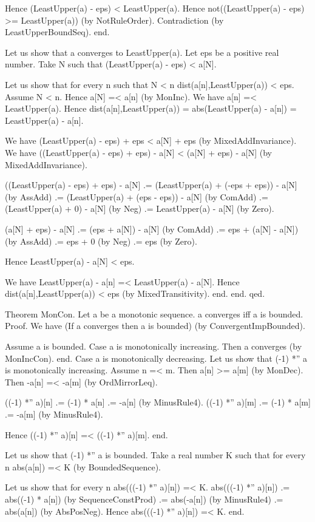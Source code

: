 \documentclass{article}
\newenvironment{forthel}{\begin{leftbar}}{\end{leftbar}}
\begin{document}
\begin{forthel}
	Hence (LeastUpper(a) - eps) < LeastUpper(a).
	Hence not((LeastUpper(a) - eps) >= LeastUpper(a)) (by NotRuleOrder).
	Contradiction (by LeastUpperBoundSeq).
	end.
	
	Let us show that a converges to LeastUpper(a).
	Let eps be a positive real number.
	Take N such that (LeastUpper(a) - eps) < a[N].
	
	Let us show that for every n such that N < n dist(a[n],LeastUpper(a)) < eps.
	Assume N < n.
	Hence a[N] =< a[n] (by MonInc).
	We have a[n] =< LeastUpper(a).
	Hence dist(a[n],LeastUpper(a)) = abs(LeastUpper(a) - a[n]) = LeastUpper(a) - a[n].
	
	We have (LeastUpper(a) - eps) + eps < a[N] + eps (by MixedAddInvariance).
	We have ((LeastUpper(a) - eps) + eps) - a[N] < (a[N] + eps) - a[N] (by MixedAddInvariance).
	
	((LeastUpper(a) - eps) + eps) - a[N] .= (LeastUpper(a) + (-eps + eps)) - a[N] (by AssAdd)
	.= (LeastUpper(a) + (eps - eps)) - a[N] (by ComAdd)
	.= (LeastUpper(a) + 0) - a[N] (by Neg)
	.= LeastUpper(a) - a[N] (by Zero).
	
	(a[N] + eps) - a[N] .= (eps + a[N]) - a[N] (by ComAdd)
	.= eps + (a[N] - a[N]) (by AssAdd)
	.= eps + 0 (by Neg)
	.= eps (by Zero).
	
	Hence LeastUpper(a) - a[N] < eps.
	
	We have LeastUpper(a) - a[n] =< LeastUpper(a) - a[N].
	Hence dist(a[n],LeastUpper(a)) < eps (by MixedTransitivity).
	end.
	end.
	qed.
	
	Theorem MonCon.
	Let a be a monotonic sequence. a converges iff a is bounded.
	Proof.
	We have (If a converges then a is bounded) (by ConvergentImpBounded).
	
	Assume a is bounded.
	Case a is monotonically increasing.
	Then a converges (by MonIncCon). 
	end.
	Case a is monotonically decreasing.
	Let us show that (-1) *'' a is monotonically increasing.
	Assume n =< m.
	Then a[n] >= a[m] (by MonDec).
	Then -a[n] =< -a[m] (by OrdMirrorLeq).
	
	((-1) *'' a)[n] .= (-1) * a[n]
	.= -a[n] (by MinusRule4).
	((-1) *'' a)[m] .= (-1) * a[m]
	.= -a[m] (by MinusRule4).
	
	Hence ((-1) *'' a)[n] =< ((-1) *'' a)[m].
	end.
	
	Let us show that (-1) *'' a is bounded.
	Take a real number K such that for every n abs(a[n]) =< K (by BoundedSequence).
	
	Let us show that for every n abs(((-1) *'' a)[n]) =< K.
	abs(((-1) *'' a)[n]) .= abs((-1) * a[n]) (by SequenceConstProd)
	.= abs(-a[n]) (by MinusRule4)
	.= abs(a[n]) (by AbsPosNeg).
	Hence abs(((-1) *'' a)[n]) =< K.
	end.
	

\end{forthel}
\end{document}
